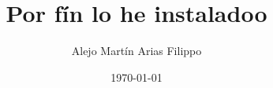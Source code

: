 

\title{\bf Por fín lo he instaladoo}          
\author{Alejo Martín Arias Filippo}                        
\date{\today}      








\tableofcontents

\listoffigures









\nocite{*}



